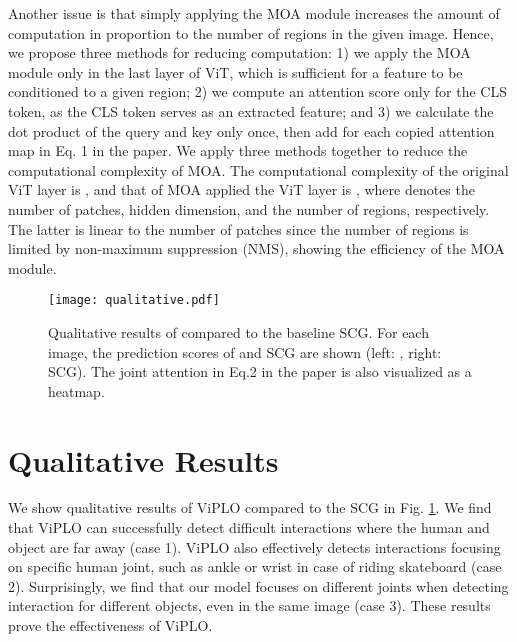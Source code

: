 \documentclass[10pt,twocolumn,letterpaper]{article}
\begin{document}
Another issue is that simply applying the MOA module increases the amount of computation in proportion to the number of regions in the given image. Hence, we propose three methods for reducing computation: 1) we apply the MOA module only in the last layer of ViT, which is sufficient for a feature to be conditioned to a given region; 2) we compute an attention score only for the CLS token, as the CLS token serves as an extracted feature; and 3) we calculate the dot product of the query and key only once, then add  for each copied attention map in Eq. 1 in the paper. We apply three methods together to reduce the computational complexity of MOA. The computational complexity of the original ViT layer is , and that of MOA applied the ViT layer is , where  denotes the number of patches, hidden dimension, and the number of regions, respectively. The latter is linear to the number of patches since the number of regions is limited by non-maximum suppression (NMS), showing the efficiency of the MOA module. 


\begin{figure}[t]
\begin{center}

\texttt{[image: qualitative.pdf]}

\end{center}
\vspace{-5mm}
  \caption{Qualitative results of  compared to the baseline SCG. For each image, the prediction scores of  and SCG are shown (left: , right: SCG). The joint attention in Eq.2 in the paper is also visualized as a heatmap.}
\vspace{-1mm}
\label{fig:qualitative}
\end{figure} 

\section{Qualitative Results}
\label{app:c}
We show qualitative results of ViPLO compared to the SCG in Fig. \ref{fig:qualitative}. We find that ViPLO can successfully detect difficult interactions where the human and object are far away (case 1). ViPLO also effectively detects interactions focusing on specific human joint, such as ankle or wrist in case of riding skateboard (case 2). Surprisingly, we find that our model focuses on different joints when detecting interaction for different objects, even in the same image (case 3). These results prove the effectiveness of ViPLO. 

 
\end{document}
